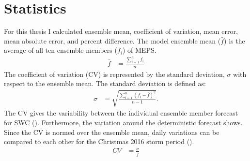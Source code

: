 \section{Statistics}
For this thesis I calculated ensemble mean, coefficient of variation, mean error, mean absolute error, and percent difference. 
\label{sec:ens_mean_spread}
The model ensemble mean ($\bar{f}$) is the average of all ten ensemble members ($f_i$) of MEPS.
\begin{align}
\bar{f} & = \frac{\sum_{i=1}^n f_i}{n} \label{eq:meanMEPS}
\end{align}
The coefficient of variation (CV) is represented by the standard deviation, $\sigma$  with respect to the ensemble mean.
The standard deviation is defined as:
\begin{align}
\sigma & = \sqrt{\frac{\sum_{i=1}^n (f_i - \bar{f})^2}{n-1}} .\label{eq:stdMEPS}
\end{align}
The CV gives the variability between the individual ensemble member forecast for SWC (). Furthermore, the variation around the deterministic forecast shows. Since the CV is normed over the ensemble mean, daily variations can be compared to each other for the Christmas 2016 storm period ().
\begin{align}
CV & = \frac{\sigma}{\bar{f}}
\end{align}
%
